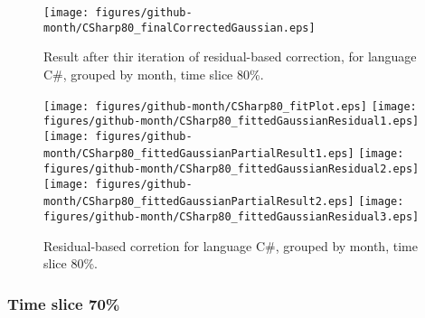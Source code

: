 \begin{figure}[]
\centering
{\texttt{[image: figures/github-month/CSharp80\_finalCorrectedGaussian.eps]}}
\caption{Result after thir iteration of residual-based correction, for language C\#, grouped by month, time slice 80\%.}
\end{figure}


\begin{figure}[hb]
\centering
{}
{\texttt{[image: figures/github-month/CSharp80\_fitPlot.eps]}}
{\texttt{[image: figures/github-month/CSharp80\_fittedGaussianResidual1.eps]}}
{\texttt{[image: figures/github-month/CSharp80\_fittedGaussianPartialResult1.eps]}}
{\texttt{[image: figures/github-month/CSharp80\_fittedGaussianResidual2.eps]}}
{\texttt{[image: figures/github-month/CSharp80\_fittedGaussianPartialResult2.eps]}}
{\texttt{[image: figures/github-month/CSharp80\_fittedGaussianResidual3.eps]}}
\caption{Residual-based corretion for language C\#, grouped by month, time slice 80\%.}
\end{figure}


\clearpage 
\newpage 


\FloatBarrier

\subsubsection{Time slice 70\%}

